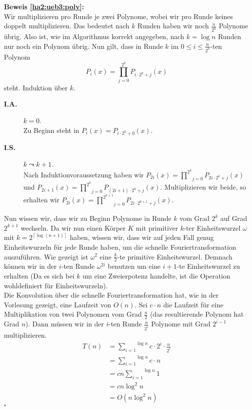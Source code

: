 \documentclass[11pt,a4paper,ngerman]{article}
\begin{document}
\textbf{Beweis \ref{ha2:ueb3:poly}:}\\
Wir multiplizieren pro Runde je zwei Polynome, wobei wir pro Runde keines doppelt multiplizieren. Das bedeutet nach $k$ Runden
haben wir noch $\frac{n}{2^k}$ Polynome übrig. Also ist, wie im Algorithmus korrekt angegeben, nach $k=\log n$ Runden nur noch
ein Polynom übrig. Nun gilt, dass in Runde $k$ im $0 \leq i \leq \frac{n}{2^k}$-ten Polynom 
\begin{equation*}
    P_i(x) = \underset{j=0}{\overset{2^k}{\prod}} P_{i\cdot 2^k+j}(x)
\end{equation*}
steht.
Induktion über $k$.
\begin{description}
    \item[\bfseries I.A.] $k = 0$.\\
        Zu Beginn steht in $P_i(x) = P_{i\cdot 2^0 + 0}(x)$.
    \item[\bfseries I.S.] $k \leadsto k+1$.\\
        Nach Induktionvoraussetzung 
        haben wir $P_{2i}(x) = \underset{j=0}{\overset{2^k}{\prod}} P_{2i\cdot 2^k + j}(x)$ und
        $P_{2i+1}(x) = \underset{j=0}{\overset{2^k}{\prod}} P_{(2i+1)\cdot 2^k + j}(x)$.
        Multiplizieren wir beide, so erhalten wir
        $P_{2i}(x) = \underset{j=0}{\overset{2^{k+1}}{\prod}} P_{2i\cdot 2^{k+1} + j}(x)$.
\end{description}

Nun wissen wir, dass wir zu Beginn Polynome in Runde $k$ vom Grad $2^k$ auf Grad $2^{k+1}$ wechseln. Da wir nun einen Körper $K$
mit primitiver $k$-ter Einheitswurzel $\omega$ mit $k=2^{\left\lceil \log (n+1)\right\rceil}$ haben, wissen wir, dass wir auf jeden Fall genug
Einheitswurzeln für jede Runde haben, um die schnelle Fouriertransformation auszuführen.
Wie gezeigt ist $\omega^2$ eine $\frac{k}{2}$-te primitive Einheitswurzel. Demnach können wir in der $i$-ten Runde $\omega^{2i}$ benutzen um eine $i+1$-te Einheitswurzel
zu erhalten (Da es sich bei $k$ um eine Zweierpotenz handelte, ist die Operation wohldefiniert für Einheitswurzeln).\\

Die Konvolution über die schnelle Fouriertransformation hat, wie in der Vorlesung gezeigt, eine Laufzeit von $O(n)$. Sei $c\cdot n$ die Laufzeit für eine Multiplikation
von twei Polynomen vom Grad $\frac{n}{2}$ (das resultierende Polynom hat Grad $n$).
Dann müssen wir in der $i$-ten Runde $\frac{n}{2^i}$ Polynome mit Grad $2^{i-1}$ multiplizieren.
\begin{equation*}\begin{split}
    T(n) &= \overset{\log n}{\underset{i=1}{\sum}} c \cdot 2^i \cdot \frac{n}{2^i}\\
        &= \overset{\log n}{\underset{i=1}{\sum}} c \cdot n\\
        &= cn \overset{\log n}{\underset{i=1}{\sum}} 1\\
        &= cn \log^2 n\\
        &= O(n \log^2 n)
\end{split}\end{equation*}
\mbox{}\hfill $\square$
\end{document}
